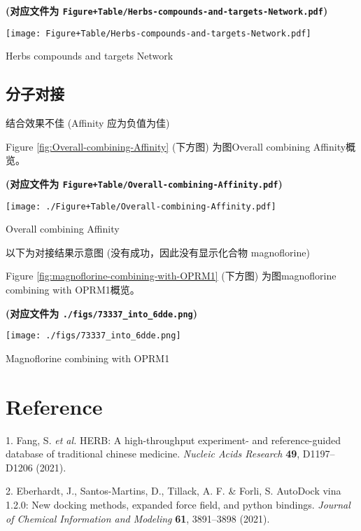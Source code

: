 \documentclass[
]{article}
\newenvironment{cslreferences}%
  {}%
  {\par}
\begin{document}
\textbf{(对应文件为 \texttt{Figure+Table/Herbs-compounds-and-targets-Network.pdf})}

\def\@captype{figure}
\begin{center}
\texttt{[image: Figure+Table/Herbs-compounds-and-targets-Network.pdf]}
\caption{Herbs compounds and targets Network}\label{fig:Herbs-compounds-and-targets-Network}
\end{center}

\hypertarget{ux5206ux5b50ux5bf9ux63a5}{%
\subsection{分子对接}\label{ux5206ux5b50ux5bf9ux63a5}}

结合效果不佳 (Affinity 应为负值为佳)

Figure \ref{fig:Overall-combining-Affinity} (下方图) 为图Overall combining Affinity概览。

\textbf{(对应文件为 \texttt{Figure+Table/Overall-combining-Affinity.pdf})}

\def\@captype{figure}
\begin{center}
\texttt{[image: ./Figure+Table/Overall-combining-Affinity.pdf]}
\caption{Overall combining Affinity}\label{fig:Overall-combining-Affinity}
\end{center}

以下为对接结果示意图 (没有成功，因此没有显示化合物 magnoflorine)

Figure \ref{fig:magnoflorine-combining-with-OPRM1} (下方图) 为图magnoflorine combining with OPRM1概览。

\textbf{(对应文件为 \texttt{./figs/73337\_into\_6dde.png})}

\def\@captype{figure}
\begin{center}
\texttt{[image: ./figs/73337\_into\_6dde.png]}
\caption{Magnoflorine combining with OPRM1}\label{fig:magnoflorine-combining-with-OPRM1}
\end{center}

\hypertarget{bibliography}{%
\section*{Reference}\label{bibliography}}

\hypertarget{refs}{}
\begin{cslreferences}
\leavevmode\hypertarget{ref-HerbAHighThFang2021}{}%
1. Fang, S. \emph{et al.} HERB: A high-throughput experiment- and reference-guided database of traditional chinese medicine. \emph{Nucleic Acids Research} \textbf{49}, D1197--D1206 (2021).

\leavevmode\hypertarget{ref-AutodockVina1Eberha2021}{}%
2. Eberhardt, J., Santos-Martins, D., Tillack, A. F. \& Forli, S. AutoDock vina 1.2.0: New docking methods, expanded force field, and python bindings. \emph{Journal of Chemical Information and Modeling} \textbf{61}, 3891--3898 (2021).
\end{cslreferences}
\end{document}
